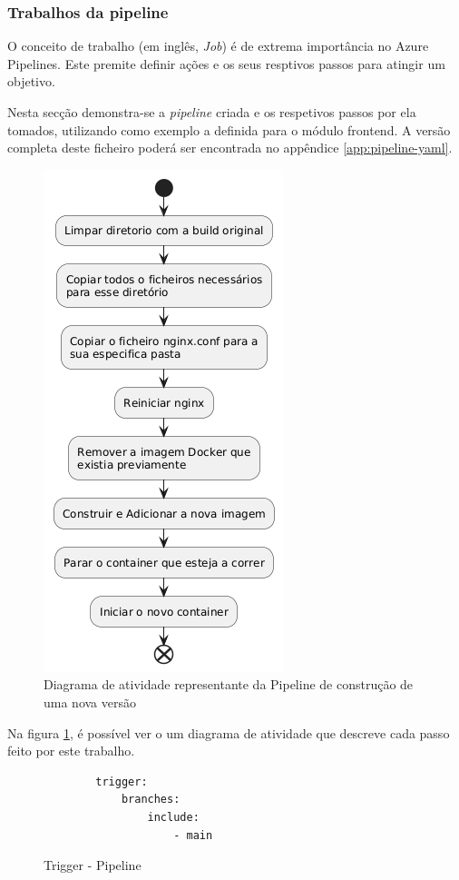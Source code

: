 \subsubsection{Trabalhos da pipeline}

O conceito de trabalho (em inglês, \textit{Job}) é de extrema importância no Azure Pipelines. Este premite definir ações e os seus resptivos passos para atingir um objetivo.

Nesta secção demonstra-se a \textit{pipeline} criada e os respetivos passos por ela tomados, utilizando como exemplo a definida para o módulo frontend. A versão completa deste ficheiro poderá ser encontrada no appêndice \ref{app:pipeline-yaml}. 

\begin{figure}
    \centering
    \includegraphics[width=0.5\linewidth]{capitulos/cap4-implementacao/assets/pipeline-activity-diagram.png}
    \caption{Diagrama de atividade representante da Pipeline de construção de uma nova versão}
    \label{fig:pipeline-ad}
\end{figure}


Na figura \ref{fig:pipeline-ad}, é possível ver o um diagrama de atividade que descreve cada passo feito por este trabalho.

\begin{figure}
    \begin{lstlisting}
        trigger:
            branches:
                include:
                    - main
    \end{lstlisting}
    \caption{Trigger - Pipeline}
    \label{fig:pipeline-trigger}
\end{figure}


